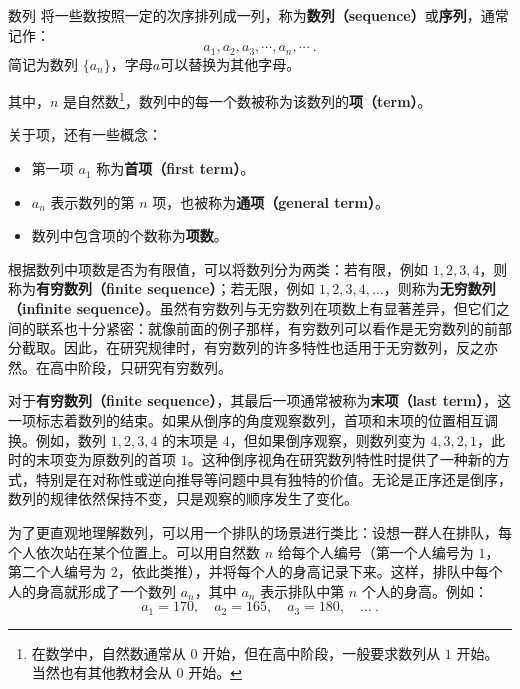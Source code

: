 \begin{definition}{数列}
将一些数按照一定的次序排列成一列，称为\textbf{数列（sequence）}或\textbf{序列}，通常记作：
\begin{equation}
a_1, a_2, a_3, \cdots, a_n, \cdots~.
\end{equation}
简记为数列 $\{a_n\}$，字母$a$可以替换为其他字母。

其中，$n$ 是自然数\footnote{在数学中，自然数通常从 $0$ 开始，但在高中阶段，一般要求数列从 $1$ 开始。当然也有其他教材会从 $0$ 开始。}，数列中的每一个数被称为该数列的\textbf{项（term）}。
\end{definition}

关于项，还有一些概念：
\begin{itemize}
\item 第一项 $a_1$ 称为\textbf{首项（first term）}。 
\item $a_n$ 表示数列的第 $n$ 项，也被称为\textbf{通项（general term）}。
\item 数列中包含项的个数称为\textbf{项数}。
\end{itemize}

根据数列中项数是否为有限值，可以将数列分为两类：若有限，例如 $1, 2, 3, 4$，则称为\textbf{有穷数列（finite sequence）}；若无限，例如 $1, 2, 3, 4, \dots$，则称为\textbf{无穷数列（infinite sequence）}。虽然有穷数列与无穷数列在项数上有显著差异，但它们之间的联系也十分紧密：就像前面的例子那样，有穷数列可以看作是无穷数列的前部分截取。因此，在研究规律时，有穷数列的许多特性也适用于无穷数列，反之亦然。在高中阶段，只研究有穷数列。

对于\textbf{有穷数列（finite sequence）}，其最后一项通常被称为\textbf{末项（last term）}，这一项标志着数列的结束。如果从倒序的角度观察数列，首项和末项的位置相互调换。例如，数列 $1, 2, 3, 4$ 的末项是 $4$，但如果倒序观察，则数列变为 $4, 3, 2, 1$，此时的末项变为原数列的首项 $1$。这种倒序视角在研究数列特性时提供了一种新的方式，特别是在对称性或逆向推导等问题中具有独特的价值。无论是正序还是倒序，数列的规律依然保持不变，只是观察的顺序发生了变化。

为了更直观地理解数列，可以用一个排队的场景进行类比：设想一群人在排队，每个人依次站在某个位置上。可以用自然数 $n$ 给每个人编号（第一个人编号为 $1$，第二个人编号为 $2$，依此类推），并将每个人的身高记录下来。这样，排队中每个人的身高就形成了一个数列 ${a_n}$，其中 $a_n$ 表示排队中第 $n$ 个人的身高。例如：
\begin{equation}
a_1 = 170, \quad a_2 = 165, \quad a_3 = 180, \quad \dots~.
\end{equation}

